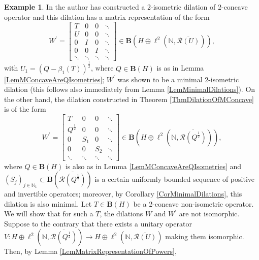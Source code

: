 \documentclass{amsart}
\theoremstyle{definition}
\newtheorem{example}[theorem]{Example}
\numberwithin{equation}{section}
\begin{document}
\begin{example}
    In \cite[Theorem 2.1]{badeaCauchyDual2IsometricLiftingsOfConcave} the author has constructed a 2-isometric dilation of 2-concave operator and this dilation has a matrix representation of the form
    \begin{equation*}
        W^{\prime} = \begin{bmatrix}
            T & 0 & 0 & \ddots\\
            U & 0 & 0 & \ddots\\
            0 & I & 0 & \ddots\\
            0 & 0 & I & \ddots\\
            \ddots & \ddots & \ddots & \ddots 
        \end{bmatrix} \in \mathbf{B}\left( H\oplus \ell^{2}(\mathbb{N},\overline{\mathcal{R}(U)}) \right),
    \end{equation*}
    with $ U_{1} = (Q-\beta_{1}(T))^{\frac{1}{2}} $, where $ Q\in \mathbf{B}(H) $ is as in Lemma \ref{LemMConcaveAreQIsometries}; $ W^{\prime} $ was shown to be a minimal 2-isometric dilation (this follows also immediately from Lemma \ref{LemMinimalDilations}). On the other hand, the dilation constructed in Theorem \ref{ThmDilationOfMConcave} is of the form
    \begin{equation*}
        W^{\prime} = \begin{bmatrix}
            T & 0 & 0 & \ddots\\
            Q^{\frac{1}{2}} & 0 & 0 & \ddots\\
            0 & S_{1} & 0 & \ddots\\
            0 & 0 & S_{2} & \ddots\\
            \ddots & \ddots & \ddots & \ddots 
        \end{bmatrix} \in \mathbf{B}\left( H\oplus \ell^{2}(\mathbb{N},\overline{\mathcal{R}(Q^{\frac{1}{2}})}) \right),
    \end{equation*}
    where $ Q\in \mathbf{B}(H) $ is also as in Lemma \ref{LemMConcaveAreQIsometries} and $ (S_{j})_{j\in \mathbb{N}_{1}}\subset \mathbf{B}(\overline{\mathcal{R}(Q^{\frac{1}{2}})}) $ is a certain uniformly bounded sequence of positive and invertible operators; moreover, by Corollary \ref{CorMinimalDilations}, this dilation is also minimal. Let $ T\in \mathbf{B}(H) $ be a 2-concave non-isometric operator. We will show that for such a $ T $, the dilations $ W $ and $ W^{\prime} $ are not isomorphic. Suppose to the contrary that there exists a unitary operator $ V\colon H\oplus \ell^{2}(\mathbb{N},\overline{\mathcal{R}(Q^{\frac{1}{2}})}) \to H\oplus \ell^{2}(\mathbb{N},\overline{\mathcal{R}(U)}) $ making them isomorphic. Then, by Lemma \ref{LemMatrixRepresentationOfPowers},

\end{example}
\end{document}
